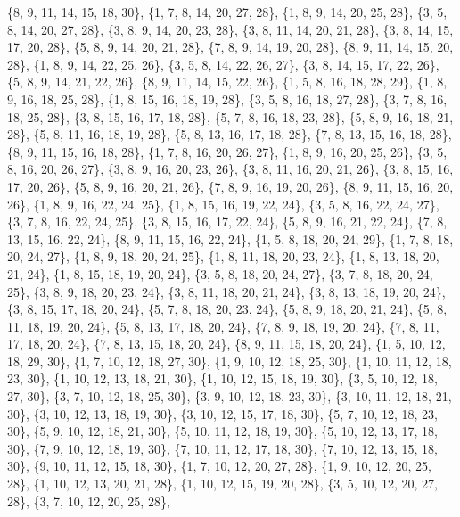 \documentclass[11pt,a4paper]{article}
\begin{document}
{\{8, 9, 11, 14, 15, 18, 30\}, \{1, 7, 8, 14, 20, 27, 28\}, \{1, 8, 9, 14, 20, 25, 28\}, \{3, 5, 8, 14, 20, 27, 28\}, \{3, 8, 9, 14, 20, 23, 28\},
\{3, 8, 11, 14, 20, 21, 28\}, \{3, 8, 14, 15, 17, 20, 28\}, \{5, 8, 9, 14, 20, 21, 28\}, \{7, 8, 9, 14, 19, 20, 28\}, \{8, 9, 11, 14, 15, 20, 28\},
\{1, 8, 9, 14, 22, 25, 26\}, \{3, 5, 8, 14, 22, 26, 27\}, \{3, 8, 14, 15, 17, 22, 26\}, \{5, 8, 9, 14, 21, 22, 26\}, \{8, 9, 11, 14, 15, 22, 26\},
\{1, 5, 8, 16, 18, 28, 29\}, \{1, 8, 9, 16, 18, 25, 28\}, \{1, 8, 15, 16, 18, 19, 28\}, \{3, 5, 8, 16, 18, 27, 28\}, \{3, 7, 8, 16, 18, 25, 28\},
\{3, 8, 15, 16, 17, 18, 28\}, \{5, 7, 8, 16, 18, 23, 28\}, \{5, 8, 9, 16, 18, 21, 28\}, \{5, 8, 11, 16, 18, 19, 28\}, \{5, 8, 13, 16, 17, 18, 28\},
\{7, 8, 13, 15, 16, 18, 28\}, \{8, 9, 11, 15, 16, 18, 28\}, \{1, 7, 8, 16, 20, 26, 27\}, \{1, 8, 9, 16, 20, 25, 26\}, \{3, 5, 8, 16, 20, 26, 27\},
\{3, 8, 9, 16, 20, 23, 26\}, \{3, 8, 11, 16, 20, 21, 26\}, \{3, 8, 15, 16, 17, 20, 26\}, \{5, 8, 9, 16, 20, 21, 26\}, \{7, 8, 9, 16, 19, 20, 26\},
\{8, 9, 11, 15, 16, 20, 26\}, \{1, 8, 9, 16, 22, 24, 25\}, \{1, 8, 15, 16, 19, 22, 24\}, \{3, 5, 8, 16, 22, 24, 27\}, \{3, 7, 8, 16, 22, 24, 25\},
\{3, 8, 15, 16, 17, 22, 24\}, \{5, 8, 9, 16, 21, 22, 24\}, \{7, 8, 13, 15, 16, 22, 24\}, \{8, 9, 11, 15, 16, 22, 24\}, \{1, 5, 8, 18, 20, 24, 29\},
\{1, 7, 8, 18, 20, 24, 27\}, \{1, 8, 9, 18, 20, 24, 25\}, \{1, 8, 11, 18, 20, 23, 24\}, \{1, 8, 13, 18, 20, 21, 24\}, \{1, 8, 15, 18, 19, 20, 24\},
\{3, 5, 8, 18, 20, 24, 27\}, \{3, 7, 8, 18, 20, 24, 25\}, \{3, 8, 9, 18, 20, 23, 24\}, \{3, 8, 11, 18, 20, 21, 24\}, \{3, 8, 13, 18, 19, 20, 24\},
\{3, 8, 15, 17, 18, 20, 24\}, \{5, 7, 8, 18, 20, 23, 24\}, \{5, 8, 9, 18, 20, 21, 24\}, \{5, 8, 11, 18, 19, 20, 24\}, \{5, 8, 13, 17, 18, 20, 24\},
\{7, 8, 9, 18, 19, 20, 24\}, \{7, 8, 11, 17, 18, 20, 24\}, \{7, 8, 13, 15, 18, 20, 24\}, \{8, 9, 11, 15, 18, 20, 24\}, \{1, 5, 10, 12, 18, 29, 30\},
\{1, 7, 10, 12, 18, 27, 30\}, \{1, 9, 10, 12, 18, 25, 30\}, \{1, 10, 11, 12, 18, 23, 30\}, \{1, 10, 12, 13, 18, 21, 30\}, \{1, 10, 12, 15, 18, 19, 30\},
\{3, 5, 10, 12, 18, 27, 30\}, \{3, 7, 10, 12, 18, 25, 30\}, \{3, 9, 10, 12, 18, 23, 30\}, \{3, 10, 11, 12, 18, 21, 30\}, \{3, 10, 12, 13, 18, 19, 30\},
\{3, 10, 12, 15, 17, 18, 30\}, \{5, 7, 10, 12, 18, 23, 30\}, \{5, 9, 10, 12, 18, 21, 30\}, \{5, 10, 11, 12, 18, 19, 30\}, \{5, 10, 12, 13, 17, 18, 30\},
\{7, 9, 10, 12, 18, 19, 30\}, \{7, 10, 11, 12, 17, 18, 30\}, \{7, 10, 12, 13, 15, 18, 30\}, \{9, 10, 11, 12, 15, 18, 30\}, \{1, 7, 10, 12, 20, 27, 28\},
\{1, 9, 10, 12, 20, 25, 28\}, \{1, 10, 12, 13, 20, 21, 28\}, \{1, 10, 12, 15, 19, 20, 28\}, \{3, 5, 10, 12, 20, 27, 28\}, \{3, 7, 10, 12, 20, 25, 28\},
}
\end{document}
